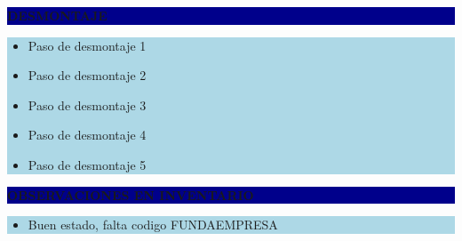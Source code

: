 \documentclass[11pt]{article}
\newcommand{\seccionbanda}[1]{%
  \vspace{0.6em}
  \noindent\colorbox{darkblue}{\parbox{\dimexpr\linewidth-2\fboxsep}{%
    \centering\color{white}\bfseries #1}}\par\vspace{0.6em}
}
\begin{document}
\seccionbanda{DESMONTAJE}
\noindent\colorbox{lightblue}{\parbox{\dimexpr\linewidth-2\fboxsep\relax}{%
\begin{itemize}[label=$\square$, itemsep=4pt]
\item Paso de desmontaje 1
\item Paso de desmontaje 2
\item Paso de desmontaje 3
\item Paso de desmontaje 4
\item Paso de desmontaje 5
\end{itemize}
}}\par
\seccionbanda{OBSERVACIONES EN INVENTARIO}
\noindent\colorbox{lightblue}{\parbox{\dimexpr\linewidth-2\fboxsep\relax}{\begin{itemize}[itemsep=4pt]
\item Buen estado, falta codigo FUNDAEMPRESA
\end{itemize}}}\par
\end{document}
